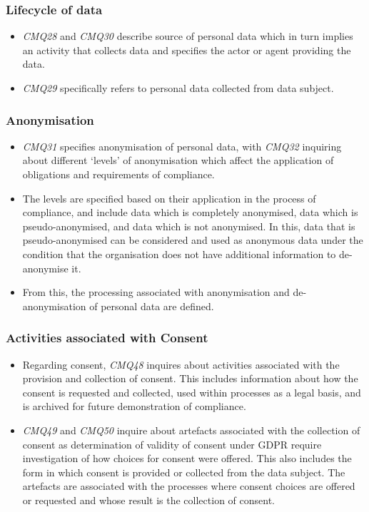 \subsubsection{Lifecycle of data}
\begin{itemize}
    \item \textit{CMQ28} and \textit{CMQ30} describe source of personal data which in turn implies an activity that collects data and specifies the actor or agent providing the data.
    \item \textit{CMQ29} specifically refers to personal data collected from data subject.
\end{itemize}

\subsubsection{Anonymisation}
\begin{itemize}
    \item \textit{CMQ31} specifies anonymisation of personal data, with \textit{CMQ32} inquiring about different `levels' of anonymisation which affect the application of obligations and requirements of compliance. 
    \item The levels are specified based on their application in the process of compliance, and include data which is completely anonymised, data which is pseudo-anonymised, and data which is not anonymised. In this, data that is pseudo-anonymised can be considered and used as anonymous data under the condition that the organisation does not have additional information to de-anonymise it. 
    \item From this, the processing associated with anonymisation and de-anonymisation of personal data are defined.
\end{itemize}

\subsubsection{Activities associated with Consent}
\begin{itemize}
    \item Regarding consent, \textit{CMQ48} inquires about activities associated with the provision and collection of consent. This includes information about how the consent is requested and collected, used within processes as a legal basis, and is archived for future demonstration of compliance.
    \item \textit{CMQ49} and \textit{CMQ50} inquire about artefacts associated with the collection of consent as determination of validity of consent under GDPR require investigation of how choices for consent were offered. This also includes the form in which consent is provided or collected from the data subject. The artefacts are associated with the processes where consent choices are offered or requested and whose result is the collection of consent.
\end{itemize}

